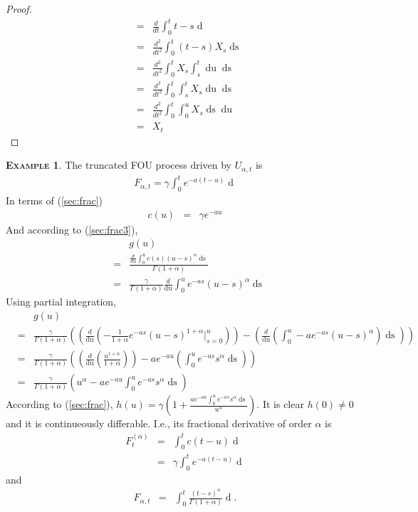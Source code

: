 \documentclass[a4paper, twoside, 11pt]{article}
\theoremstyle{definition}
\newtheorem{example}[definition]{\scshape Example}
\newcommand{\brkt}[1]{\left({#1} \right)}
\begin{document}
\begin{proof}
\begin{eqnarray*}
	&=& \frac{d}{dt}\int_0^t t-s \mathop{dX_s}\\
	&=& \frac{d^2}{dt^2}\int_0^t (t-s) X_s \mathop{ds}\\
	&=& \frac{d^2}{dt^2}\int_0^t X_s \int_s^t \mathop{du}  \mathop{ds}\\
	&=& \frac{d^2}{dt^2} \int_0^t \int_s^t X_s \mathop{du}  \mathop{ds}\\
	&=& \frac{d^2}{dt^2} \int_0^t \int_0^u X_s \mathop{ds}  \mathop{du}\\
	&=& X_t
  \end{eqnarray*}
\end{proof}
  \begin{example}
  The truncated FOU process driven by $U_{\alpha, t}$ is 
  \begin{eqnarray}
  F_{\alpha,t} = \gamma\int_0^t e^{-a(t-u)}\mathop{dU_{\alpha, u}} 
  \label{sec:cc2}
\end{eqnarray}
In terms of (\ref{sec:frac})
\begin{eqnarray*}
  c(u) &=&  \gamma e^{-au}
\end{eqnarray*}
And according to  (\ref{sec:frac3}),
\begin{eqnarray*}
  &&g(u)\\
  &=& \frac{\frac{d}{du}\int_0^{u} c(s)(u-s)^\alpha \mathop{ds}}{\Gamma(1+\alpha)}\\
  &=& \frac{\gamma}{\Gamma(1+\alpha)}\frac{d}{\mathop{du}}\int_0^u e^{-as} (u-s)^\alpha \mathop{ds}
\end{eqnarray*}
Using partial integration,
\begin{eqnarray*}
  &&g(u)\\
  &=& \frac{\gamma}{\Gamma(1+\alpha)}\brkt{\brkt{\frac{d}{\mathop{du}} (-\frac{1}{1+\alpha}e^{-as}(u-s)^{1+\alpha}|_{s=0}^u)} - \brkt{\frac{d}{\mathop{du}}(\int_0^u -a e^{-as}(u-s)^\alpha)\mathop{ds}}}\\
  &=& \frac{\gamma}{\Gamma(1+\alpha)}\brkt{\brkt{\frac{d}{\mathop{du}}(\frac{u^{1+\alpha}}{1+\alpha})} - a e^{-au}\brkt{\int_0^u e^{-as}s^\alpha\mathop{ds}}}\\
  &=& \frac{\gamma}{\Gamma(1+\alpha)} (u^\alpha - a e^{-au}\int_0^u e^{-as}s^\alpha\mathop{ds})
\end{eqnarray*}
According to (\ref{sec:frac}), $h(u) = \gamma (1 + \frac{a e^{-au}\int_0^u e^{-as}s^\alpha\mathop{ds}}{u^\alpha})$. It is clear $h(0)\neq 0$ and it is continueously differable. I.e., its fractional derivative of order $\alpha$ is 
\begin{eqnarray*}
  F^{(\alpha)}_t &=&  \int_0^t c(t-u) \mathop{dB_u}\\
  &=& \gamma\int_0^t e^{-a(t-u)}\mathop{dB_u}
\end{eqnarray*}
and 
\begin{eqnarray*}
  F_{\alpha,t} &=& \int_0^t \frac{(t-s)^\alpha}{\Gamma(1+\alpha)} \mathop{dF^{(\alpha)}(s)}.
\end{eqnarray*}
\end{example}
\end{document}
